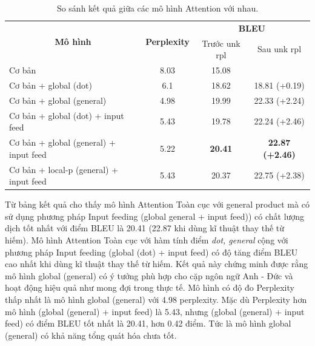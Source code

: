 

\begin{table}
	\centering
	\begin{tabular}{|l|c|c|c|} 
		\hline
		\multicolumn{1}{|c|}{\multirow{2}{*}{ \textbf{Mô hình} }} & \multirow{2}{*}{\textbf{Perplexity } } & \multicolumn{2}{c|}{\textbf{BLEU } }      \\ 
		\cline{3-4}
		\multicolumn{1}{|c|}{}                                    &                                        & Trước unk rpl   & Sau unk rpl             \\ 
		\hline
		Cơ bản                                                    & 8.03                                   & 15.08           &                         \\ 
		\hline
		Cơ bản + global (dot)                                     & 6.1                                    & 18.62           & 18.81 (+0.19)           \\ 
		\hline
		Cơ bản + global (general)                                 & 4.98                                   & 19.99           & 22.33 (+2.24)           \\ 
		\hline
		Cơ bản + global (dot) + input feed                        & 5.43                                   & 19.78           & 22.24 (+2.46)           \\ 
		\hline
		Cơ bản + global (general) + input feed                    & 5.22                                   & \textbf{20.41}  & \textbf{22.87 (+2.46)}  \\ 
		\hline
		Cơ bản + local-p (general) + input feed                   & 5.43                                   & 20.37           & 22.75 (+2.38)           \\
		\hline
	\end{tabular}
	\caption{So sánh kết quả giữa các mô hình Attention với nhau.}
	\label{tab_attn-vs-attn}
\end{table}

Từ bảng kết quả cho thấy mô hình Attention Toàn cục với general product mà có sử dụng phương pháp Input feeding (global general + input feed)) có chất lượng dịch tốt nhất với điểm BLEU là 20.41 (22.87 khi dùng kĩ thuật thay thế từ hiếm). Mô hình Attention Toàn cục với hàm tính điểm \textit{dot, general} cộng với phương pháp Input feeding (global (dot) + input feed) có độ tăng điểm BLEU cao nhất khi dùng kĩ thuật thay thế từ hiếm. Kết quả này chứng minh được rằng mô hình global (general) có ý tưởng phù hợp cho cặp ngôn ngữ Anh - Đức và hoạt động hiệu quả như mong đợi trong thực tế.  Mô hình có độ đo Perplexity thấp nhất là mô hình global (general) với 4.98 perplexity. Mặc dù Perplexity hơn mô hình (global (general) + input feed) là 5.43, nhưng (global (general) + input feed) có điểm BLEU tốt nhất là 20.41, hơn 0.42 điểm. Tức là mô hình global (general) có khả năng tổng quát hóa chưa tốt.
 
